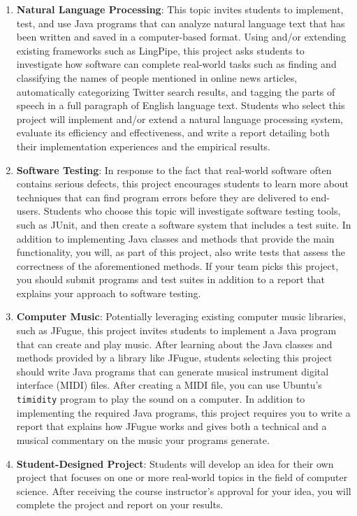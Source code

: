 \begin{enumerate}
  \item {\bf Natural Language Processing}: This topic invites students to implement, test, and use Java programs that
    can analyze natural language text that has been written and saved in a computer-based format.  Using and/or
    extending existing frameworks such as LingPipe, this project asks students to investigate how software can complete
    real-world tasks such as finding and classifying the names of people mentioned in online news articles,
    automatically categorizing Twitter search results, and tagging the parts of speech in a full paragraph of English
    language text. Students who select this project will implement and/or extend a natural language processing system,
    evaluate its efficiency and effectiveness, and write a report detailing both their implementation experiences and
    the empirical results.

  \item {\bf Software Testing}: In response to the fact that real-world software often contains serious defects, this
    project encourages students to learn more about techniques that can find program errors before they are delivered to
    end-users. Students who choose this topic will investigate software testing tools, such as JUnit, and then create 
    a software system that includes a test suite. In addition to implementing Java classes and methods that provide the
    main functionality, you will, as part of this project, also write tests that assess the correctness of the 
    aforementioned methods. If your team picks this project, you should submit programs and test suites in
    addition to a report that explains your approach to software testing.

  \item {\bf Computer Music}: Potentially leveraging existing computer music libraries, such as JFugue, this project
    invites students to implement a Java program that can create and play music. After learning about the Java classes
    and methods provided by a library like JFugue, students selecting this project should write Java programs that can
    generate musical instrument digital interface (MIDI) files. After creating a MIDI file, you can use Ubuntu's {\tt
      timidity} program to play the sound on a computer. In addition to implementing the required Java programs, this
    project requires you to write a report that explains how JFugue works and gives both a technical and a musical
    commentary on the music your programs generate. 

  \item {\bf Student-Designed Project}: Students will develop an idea for their own project that focuses on one or more
    real-world topics in the field of computer science. After receiving the course instructor's approval for your idea,
    you will complete the project and report on your results.

\end{enumerate} 

